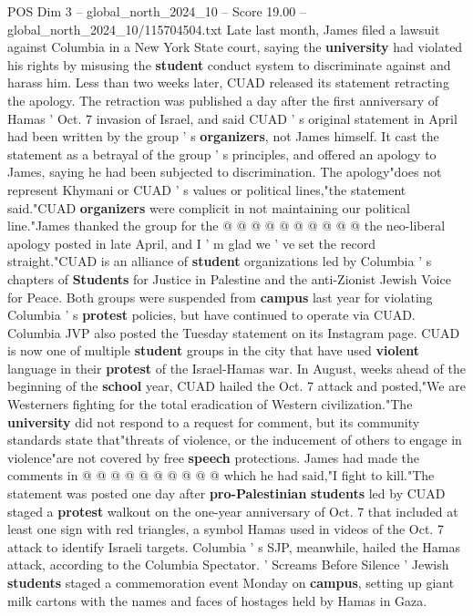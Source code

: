 \begin{textsample}{POS Dim 3 – global\_north\_2024\_10 – Score 19.00 – global\_north\_2024\_10/115704504.txt}
Late last month, James filed a lawsuit against Columbia in a New York State court, saying the \textbf{university} had violated his rights by misusing the \textbf{student} conduct system to discriminate against and harass him.
Less than two weeks later, CUAD released its statement retracting the apology.
The retraction was published a day after the first anniversary of Hamas ' Oct. 7 invasion of Israel, and said CUAD ' s original statement in April had been written by the group ' s \textbf{organizers}, not James himself.
It cast the statement as a betrayal of the group ' s principles, and offered an apology to James, saying he had been subjected to discrimination.
The apology"does not represent Khymani or CUAD ' s values or political lines,"the statement said."CUAD \textbf{organizers} were complicit in not maintaining our political line."James thanked the group for the @ @ @ @ @ @ @ @ @ @ the neo-liberal apology posted in late April, and I ' m glad we ' ve set the record straight."CUAD is an alliance of \textbf{student} organizations led by Columbia ' s chapters of \textbf{Students} for Justice in Palestine and the anti-Zionist Jewish Voice for Peace.
Both groups were suspended from \textbf{campus} last year for violating Columbia ' s \textbf{protest} policies, but have continued to operate via CUAD.
Columbia JVP also posted the Tuesday statement on its Instagram page.
CUAD is now one of multiple \textbf{student} groups in the city that have used \textbf{violent} language in their \textbf{protest} of the Israel-Hamas war.
In August, weeks ahead of the beginning of the \textbf{school} year, CUAD hailed the Oct. 7 attack and posted,"We are Westerners fighting for the total eradication of Western civilization."The \textbf{university} did not respond to a request for comment, but its community standards state that"threats of violence, or the inducement of others to engage in violence"are not covered by free \textbf{speech} protections.
James had made the comments in @ @ @ @ @ @ @ @ @ @ which he had said,"I fight to kill."The statement was posted one day after \textbf{pro-Palestinian} \textbf{students} led by CUAD staged a \textbf{protest} walkout on the one-year anniversary of Oct. 7 that included at least one sign with red triangles, a symbol Hamas used in videos of the Oct. 7 attack to identify Israeli targets.
Columbia ' s SJP, meanwhile, hailed the Hamas attack, according to the Columbia Spectator. ' Screams Before Silence ' Jewish \textbf{students} staged a commemoration event Monday on \textbf{campus}, setting up giant milk cartons with the names and faces of hostages held by Hamas in Gaza.

\end{textsample}
